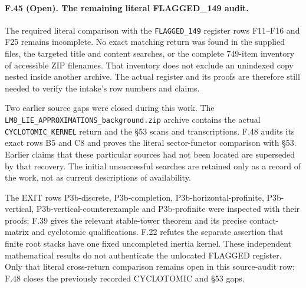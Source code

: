 \paragraph{F.45 (Open). The remaining literal FLAGGED\_149 audit.}
The required literal comparison with the \texttt{FLAGGED\_149}
register rows F11--F16 and F25 remains incomplete. No exact matching
return was found in the supplied files, the targeted title and content
searches, or the complete 749-item inventory of accessible ZIP
filenames. That inventory does not exclude an unindexed copy nested
inside another archive. The actual register and its proofs are
therefore still needed to verify the intake's row numbers and claims.

Two earlier source gaps were closed during this work. The
\texttt{LM8\_LIE\_APPROXIMATIONS\_background.zip} archive contains
the actual \texttt{CYCLOTOMIC\_KERNEL} return and the \S53 scans and
transcriptions. F.48 audits its exact rows B5 and C8 and proves the
literal sector-functor comparison with \S53. Earlier claims that
these particular sources had not been located are superseded by
that recovery. The initial unsuccessful searches are retained only
as a record of the work, not as current descriptions of availability.

The EXIT rows P3b-discrete, P3b-completion,
P3b-horizontal-profinite, P3b-vertical,
P3b-vertical-counterexample and P3b-profinite were inspected with
their proofs; F.39 gives the relevant stable-tower theorem and its
precise contact-matrix and cyclotomic qualifications. F.22 refutes
the separate assertion that finite root stacks have one fixed
uncompleted inertia kernel. These independent mathematical results
do not authenticate the unlocated FLAGGED register. Only that
literal cross-return comparison remains open in this source-audit
row; F.48 closes the previously recorded CYCLOTOMIC and \S53 gaps.
